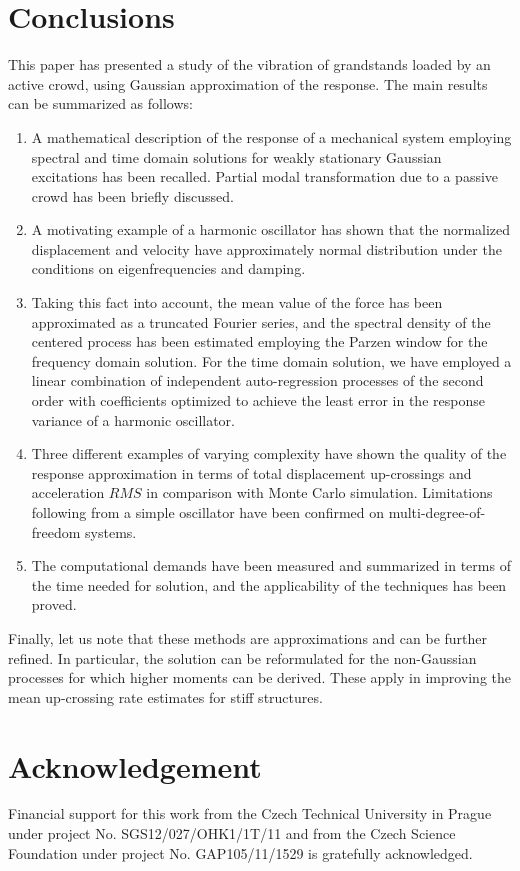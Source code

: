 \documentclass[preprint,12pt,authoryear]{elsarticle}
\begin{document}
\section{Conclusions}
\label{concl}
This paper has presented a study of the vibration of grandstands loaded by an active crowd, using Gaussian approximation of the response. The main results can be summarized as follows:
\begin{enumerate}
	\item A mathematical description of the response of a mechanical system employing spectral and time domain solutions for weakly stationary Gaussian excitations has been recalled. Partial modal transformation due to a passive crowd has been briefly discussed.
	\item A motivating example of a harmonic oscillator has shown that the normalized displacement and velocity have approximately normal distribution under the conditions on eigenfrequencies and damping.
	\item Taking this fact into account, the mean value of the force has been approximated as a truncated Fourier series, and the spectral density of the centered process has been estimated employing the Parzen window for the frequency domain solution. For the time domain solution, we have employed a linear combination of independent auto-regression processes of the second order with coefficients optimized to achieve the least error in the response variance of a harmonic oscillator.
	\item Three different examples of varying complexity have shown the quality of the response approximation in terms of total displacement up-crossings and acceleration $RMS$ in comparison with Monte Carlo simulation. Limitations following from a simple oscillator have been confirmed on multi-degree-of-freedom systems. 
	\item The computational demands have been measured and summarized in terms of the time needed for solution, and the applicability of the techniques has been proved.
\end{enumerate}
Finally, let us note that these methods are approximations and can be further refined. In particular, the solution can be reformulated for the non-Gaussian processes for which higher moments can be derived. These apply in improving the mean up-crossing rate estimates for stiff structures.
\section*{Acknowledgement}
Financial support for this work from the Czech Technical University in Prague
under project No. SGS12/027/OHK1/1T/11 and from the Czech Science Foundation under project No. GAP105/11/1529 is gratefully acknowledged.
\end{document}
